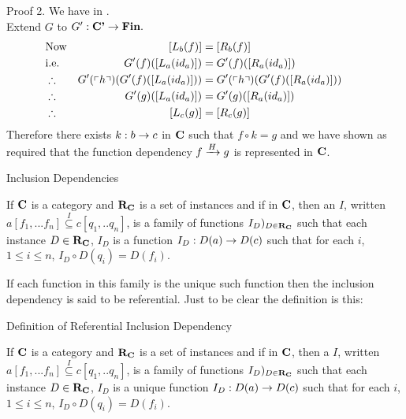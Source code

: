 \begin{frame}{Proof 2.}
We have   in \catcp.\\
\medskip
Extend $G$ to $G':\catcp \morph \Fin.$ \\

\medskip
\begin{align*}
&\mbox{Now} & [L_b(f)]                         &= [R_b(f)]                 \\
&\mbox{i.e.}& G'(f)([L_a(id_a)])              &= G'(f)([R_a(id_a)])       \\
&\therefore & G'(\qq{h}) (G'(f)([L_a(id_a)])) &= G'(\qq{h}) (G'(f)([R_a(id_a)])) \\
&\therefore & G'(g)([L_a(id_a)])              &= G'(g)([R_a(id_a)]) & &    \\
&\therefore & [L_c(g)]                        &= [R_c(g)] 
\end{align*}
Therefore there exists $k:b \morph c$ in 
$\catc$ such that $f \circ k = g$ and we have shown as required that the function dependency
$\fundep{H}{f}{g}$ is represented in $\catc$.
\end{frame}


\begin{frame}{Inclusion Dependencies}
\begin{definition}
If $\catc$ is a category and $\reqtc$ is a set of instances 
and if
\fnsourceqnsource
in $\catc$, then an  $I$, written $a[f_1,...f_n] \overset{I}{\subseteq} c[q_1,..q_n]$, is a family of functions $I_D)_{D \in \reqtc}$
such that each instance $D \in \reqtc$, $I_D$ is a function $I_D : D(a) \morph D(c)$ such that
for each $i$, $1 \leq i \le n$, $I_D \circ D(q_i) = D(f_i)$.
\end{definition}

If each function in this family is the unique such function then the inclusion dependency is said to be referential. Just to be clear the definition is this:
\end{frame}

\begin{frame}{Definition of Referential Inclusion Dependency}
\begin{definition}
If $\catc$ is a category and $\reqtc$ is a set of instances 
and if
\fnsourceqnsource
in $\catc$, then a  $I$, written $a[f_1,...f_n] \overset{I}{\subseteq} c[q_1,..q_n]$, is a family of functions $I_D)_{D \in \reqtc}$
such that each instance $D \in \reqtc$, $I_D$ is a unique function $I_D : D(a) \morph D(c)$ such that
for each $i$, $1 \leq i \le n$, $I_D \circ D(q_i) = D(f_i)$.
\end{definition}
\end{frame}


